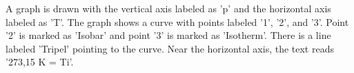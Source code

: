 A graph is drawn with the vertical axis labeled as 'p' and the horizontal axis labeled as 'T'. The graph shows a curve with points labeled '1', '2', and '3'. Point '2' is marked as 'Isobar' and point '3' is marked as 'Isotherm'. There is a line labeled 'Tripel' pointing to the curve. Near the horizontal axis, the text reads '273,15 K = Ti'.